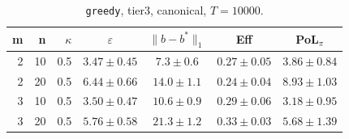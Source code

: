\begin{table}[htbp]
\centering
\scriptsize
\caption{\texttt{greedy}, tier3, canonical, $T=10000$.}
\label{tab:tier3_long_greedy}
\begin{tabular}{@{}rrrcccc@{}}
\toprule
m & n & $\kappa$ & $\varepsilon$ & $\|b-b^*\|_1$ & Eff & PoL$_\pi$ \\
\midrule
2 & 10 & 0.5 & $3.47 \pm 0.45$ & $7.3 \pm 0.6$ & $0.27 \pm 0.05$ & $3.86 \pm 0.84$ \\
2 & 20 & 0.5 & $6.44 \pm 0.66$ & $14.0 \pm 1.1$ & $0.24 \pm 0.04$ & $8.93 \pm 1.03$ \\
\midrule
3 & 10 & 0.5 & $3.50 \pm 0.47$ & $10.6 \pm 0.9$ & $0.29 \pm 0.06$ & $3.18 \pm 0.95$ \\
3 & 20 & 0.5 & $5.76 \pm 0.58$ & $21.3 \pm 1.2$ & $0.33 \pm 0.03$ & $5.68 \pm 1.39$ \\
\bottomrule
\end{tabular}
\end{table}
